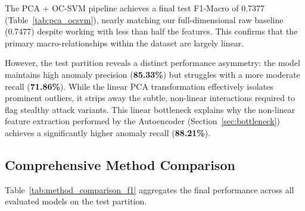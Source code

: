 
    The PCA + OC-SVM pipeline achieves a final test F1-Macro of 0.7377 (Table~\ref{tab:pca_ocsvm}), nearly matching our full-dimensional raw baseline (0.7477) despite working with less than half the features. 
    This confirms that the primary macro-relationships within the dataset are largely linear. 

    However, the test partition reveals a distinct performance asymmetry: the model maintains high anomaly precision (\textbf{85.33\%}) but struggles with a more moderate recall (\textbf{71.86\%}). 
    While the linear PCA transformation effectively isolates prominent outliers, it strips away the subtle, non-linear interactions required to flag stealthy attack variants. 
    This linear bottleneck explains why the non-linear feature extraction performed by the Autoencoder (Section~\ref{sec:bottleneck}) achieves a significantly higher anomaly recall (\textbf{88.21\%}).

\subsection{Comprehensive Method Comparison} \label{sec:comparison_task3}

    Table~\ref{tab:method_comparison_f1} aggregates the final performance across all evaluated models on the test partition.

